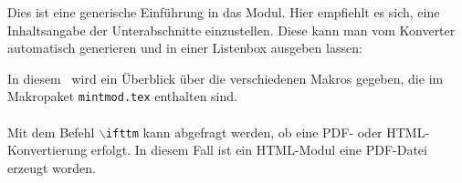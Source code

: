 







\begin{MSectionStart}
Dies ist eine generische Einführung in das Modul. Hier empfiehlt es sich, eine Inhaltsangabe
der Unterabschnitte einzustellen. Diese kann man vom Konverter automatisch generieren und
in einer Listenbox ausgeben lassen:

\MModstartBox

In diesem \MSsectionlabelprefix\ wird ein Überblick über die verschiedenen Makros gegeben, die im Makropaket \texttt{mintmod.tex} enthalten sind.
\ \\ \ \\
Mit dem Befehl \texttt{$\backslash$ifttm} kann abgefragt werden, ob eine PDF- oder HTML-Konvertierung erfolgt. In diesem
Fall ist
\ifttm%
ein HTML-Modul
\else%
eine PDF-Datei
\fi
erzeugt worden.
\end{MSectionStart}




